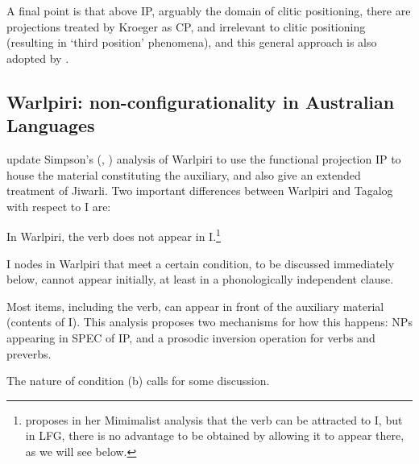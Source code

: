 \documentclass[output=paper,hidelinks]{langscibook}
\begin{document}
A final point is that above IP, arguably the domain of clitic positioning, there
are projections treated by Kroeger as CP, and irrelevant to clitic positioning
(resulting in `third position' phenomena), and this general approach is also adopted
by \citet{Kaufman2010}.


\subsection{Warlpiri: non-configurationality in Australian Languages}\label{ausnonconfig}
\citet{AustBres96} update Simpson's (\citeyear{Simpson1983}, \citeyear{Simpson1991}) analysis
of Warlpiri to use the functional projection IP to house the material constituting the auxiliary,
and also give an extended treatment
of Jiwarli.  Two important differences between Warlpiri and Tagalog with
respect to I are:
\ea
\begin{xlist}
\item In Warlpiri, the verb does not appear in I.\footnote
 {\citet{Legate2008warl2p} proposes in her Mimimalist analysis that the verb can be
 attracted to I, but in LFG, there is no advantage to be obtained by allowing it
 to appear there, as we will see below.}
\item I nodes in Warlpiri that meet a certain condition, to be discussed immediately below, cannot
appear initially, at least in a phonologically independent clause.
\item Most items, including the verb, can appear in front of the auxiliary
material (contents of I).  This analysis proposes two mechanisms for how this happens:
NPs appearing in SPEC of IP, and a prosodic inversion operation for verbs and preverbs.
\end{xlist}
\z
The nature of condition (b) calls for some discussion.
\end{document}
